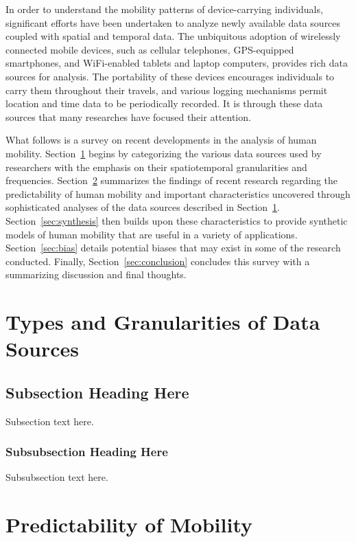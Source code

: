 \documentclass[journal]{IEEEtran}
\begin{document}
In order to understand the mobility patterns of device-carrying individuals, significant efforts have been undertaken to analyze newly available data sources coupled with spatial and temporal data. The unbiquitous adoption of wirelessly connected mobile devices, such as cellular telephones, GPS-equipped smartphones, and WiFi-enabled tablets and laptop computers, provides rich data sources for analysis. The portability of these devices encourages individuals to carry them throughout their travels, and various logging mechanisms permit location and time data to be periodically recorded. It is through these data sources that many researches have focused their attention.

What follows is a survey on recent developments in the analysis of human mobility. Section~\ref{sec:sources} begins by categorizing the various data sources used by researchers with the emphasis on their spatiotemporal granularities and frequencies. Section~\ref{sec:predict} summarizes the findings of recent research regarding the predictability of human mobility and important characteristics uncovered through sophisticated analyses of the data sources described in Section~\ref{sec:sources}. Section~\ref{sec:synthesis} then builds upon these characteristics to provide synthetic models of human mobility that are useful in a variety of applications. Section~\ref{sec:bias} details potential biases that may exist in some of the research conducted. Finally, Section~\ref{sec:conclusion} concludes this survey with a summarizing discussion and final thoughts.

\section{Types and Granularities of Data Sources} \label{sec:sources}


\subsection{Subsection Heading Here}
Subsection text here.


\subsubsection{Subsubsection Heading Here}
Subsubsection text here.


\section{Predictability of Mobility} \label{sec:predict}
\end{document}
